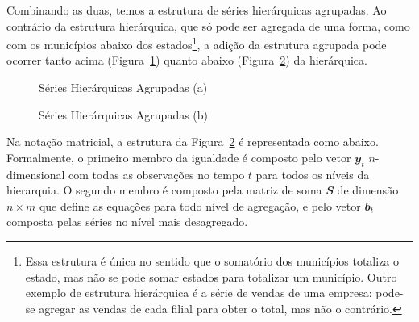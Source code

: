 \documentclass[
  12pt,
  twoside,
  openright,
  a4paper,
  chapter=TITLE,
  section=TITLE,
  brazil]{abntex2}
\begin{document}
Combinando as duas, temos a estrutura de séries hierárquicas agrupadas.
Ao contrário da estrutura hierárquica, que só pode ser agregada de uma
forma, como com os municípios abaixo dos estados\footnote{Essa estrutura
  é única no sentido que o somatório dos municípios totaliza o estado,
  mas não se pode somar estados para totalizar um município. Outro
  exemplo de estrutura hierárquica é a série de vendas de uma empresa:
  pode-se agregar as vendas de cada filial para obter o total, mas não o
  contrário.}, a adição da estrutura agrupada pode ocorrer tanto acima
(Figura~\ref{fig-ha1}) quanto abaixo (Figura~\ref{fig-ha2}) da
hierárquica.

\begin{figure}


\caption{\label{fig-ha1}Séries Hierárquicas Agrupadas (a)}

\end{figure}%

\begin{figure}


\caption{\label{fig-ha2}Séries Hierárquicas Agrupadas (b)}

\end{figure}%

Na notação matricial, a estrutura da Figura~\ref{fig-ha2} é representada
como abaixo. Formalmente, o primeiro membro da igualdade é composto pelo
vetor \(\mathbfit{y}_t\) \(n\)-dimensional com todas as observações no
tempo \(t\) para todos os níveis da hierarquia. O segundo membro é
composto pela matriz de soma \(\mathbfit{S}\) de dimensão \(n \times m\)
que define as equações para todo nível de agregação, e pelo vetor
\(\mathbfit{b}_t\) composta pelas séries no nível mais desagregado.
\end{document}
